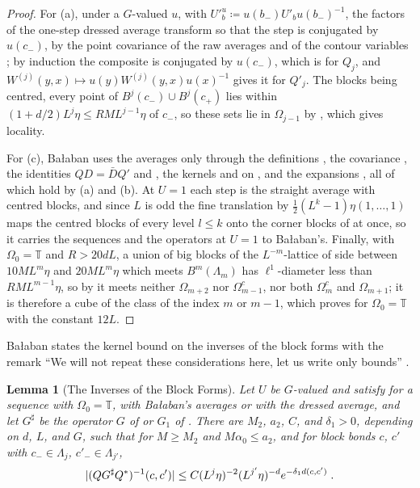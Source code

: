 \documentclass[11pt]{preprint}
\DeclarePairedDelimiter{\abs}{\lvert}{\rvert}
\numberwithin{equation}{section}
\newtheorem{lemma}{Lemma}[section]
\theoremstyle{definition}
\theoremstyle{remark}
\theoremstyle{plain}
\begin{document}
\begin{proof}
For (a), under a $G$-valued $u$, with $U'^u_b \coloneqq u(b_-)U'_bu(b_-)^{-1}$, the factors of the one-step dressed average \cite[p.~418, l.~6]{BalabanPBG} transform so that the step is conjugated by $u(c_-)$, by the point covariance of the raw averages and of the contour variables \cite[(0.6)]{BalabanRG1}; by induction the composite is conjugated by $u(c_-)$, which is \cite[(3.32)]{BalabanPBG} for $Q_j$, and $W^{(j)}(y, x) \mapsto u(y)W^{(j)}(y, x)u(x)^{-1}$ gives it for $Q'_j$. The blocks being centred, every point of $B^j(c_-) \cup B^j(c_+)$ lies within $(1 + d/2)L^j\eta \leq RML^{j-1}\eta$ of $c_-$, so these sets lie in $\Omega_{j-1}$ by \cite[(2.2)]{BalabanPRT2}, which gives locality.

For (c), Ba{\l}aban uses the averages only through the definitions \cite[(3.13)--(3.19); p.~393, l.~46--p.~394, l.~2]{BalabanPBG}, the covariance \cite[(3.32)--(3.34)]{BalabanPBG}, the identities $QD = \bar DQ'$ and \cite[(3.113)--(3.115)]{BalabanPBG}, the kernels and \cite[(3.102)]{BalabanPBG} on \cite[p.~414, ll.~13--22]{BalabanPBG}, and the expansions \cite[(3.55)--(3.59), (3.78)--(3.81)]{BalabanPBG}, all of which hold by (a) and (b). At $U = 1$ each step is the straight average with centred blocks, and since $L$ is odd the fine translation by $\frac12(L^k - 1)\eta(1, \dots, 1)$ maps the centred blocks of every level $l \leq k$ onto the corner blocks of \cite[(2), p.~17]{BalabanAVG} at once, so it carries the sequences and the operators at $U = 1$ to Ba{\l}aban's. Finally, with $\Omega_0 = \mathbb T$ and $R > 20dL$, a union of big blocks of the $L^{-m}$-lattice of side between $10ML^m\eta$ and $20ML^m\eta$ which meets $B^m(\Lambda_m)$ has $\ell^1$-diameter less than $RML^{m-1}\eta$, so by \cite[(2.2)]{BalabanPRT2} it meets neither $\Omega_{m+2}$ nor $\Omega_{m-1}^c$, nor both $\Omega_m^c$ and $\Omega_{m+1}$; it is therefore a cube of the class \cite[(3.35)]{BalabanPBG} of the index $m$ or $m - 1$, which proves \cite[p.~408, l.~35--p.~409, l.~2]{BalabanPBG} for $\Omega_0 = \mathbb T$ with the constant $12L$.
\end{proof}

Ba{\l}aban states the kernel bound \cite[(3.132)]{BalabanPBG} on the inverses of the block forms with the remark ``We will not repeat these considerations here, let us write only bounds'' \cite[p.~422, ll.~15--19]{BalabanPBG}.

\begin{lemma}[The Inverses of the Block Forms]\label{lem:pbg-3132}
Let $U$ be $G$-valued and satisfy \cite[(3.35)--(3.36)]{BalabanPBG} for a sequence with $\Omega_0 = \mathbb T$, with Ba{\l}aban's averages or with the dressed average, and let $G^\sharp$ be the operator $G$ of \cite[(3.122)]{BalabanPBG} or $G_1$ of \cite[(3.128)]{BalabanPBG}. There are $M_2$, $a_2$, $C$, and $\delta_1 > 0$, depending on $d$, $L$, and $G$, such that for $M \geq M_2$ and $M\alpha_0 \leq a_2$, and for block bonds $c$, $c'$ with $c_- \in \Lambda_j$, $c'_- \in \Lambda_{j'}$,
\begin{equation}\label{eq:pbg-3132}
    \abs{(QG^\sharp Q^*)^{-1}(c, c')} \leq C(L^j\eta)^{-2}(L^{j'}\eta)^{-d}e^{-\delta_1d(c,c')}\;.
\end{equation}
\end{lemma}
\end{document}
